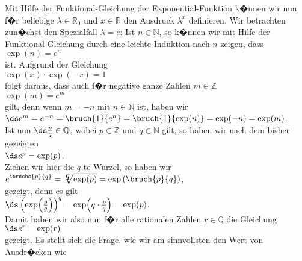 \remark
Mit Hilfe der Funktional-Gleichung der Exponential-Funktion k�nnen wir nun f�r beliebige $\lambda \in \mathbb{R}_0$
und $x \in \mathbb{R}$ den Ausdruck $\lambda^x$ definieren.  Wir betrachten zun�chst den Spezialfall
$\lambda = e$:
Ist $n \in \mathbb{N}$, so k�nnen wir mit Hilfe der Funktional-Gleichung durch eine leichte Induktion
nach $n$ zeigen, dass 
\\[0.2cm]
\hspace*{1.3cm}
$\exp(n) = e^n$
\\[0.2cm]
ist.  Aufgrund der Gleichung
\\[0.2cm]
\hspace*{1.3cm}
$\exp(x) \cdot \exp(-x) = 1$
\\[0.2cm]
folgt daraus, dass auch f�r negative ganze Zahlen $m \in \mathbb{Z}$ 
\\[0.2cm]
\hspace*{1.3cm}
$\exp(m) = e^m$
\\[0.2cm]
gilt, denn wenn $m = -n$ mit $n \in \mathbb{N}$ ist, haben wir
\\[0.2cm]
\hspace*{1.3cm}
$\ds e^m = e^{-n} = \bruch{1}{e^n} = \bruch{1}{\exp(n)} = \exp(-n) = \exp(m)$.
\\[0.2cm]
Ist nun $\ds\frac{p}{q} \in \mathbb{Q}$, wobei $p \in \mathbb{Z}$ und $q \in \mathbb{N}$ gilt, so haben wir 
nach dem bisher gezeigten
\\[0.2cm]
\hspace*{1.3cm}
$\ds e^p = \exp(p)$.
\\[0.2cm]
Ziehen wir hier die $q$-te Wurzel, so haben wir
\\[0.2cm]
\hspace*{1.3cm}
$\displaystyle e^{\bruchs{p}{q}} = \sqrt[\textstyle q]{\exp(p)} = \exp\left(\bruch{p}{q}\right)$,
\\[0.2cm]
gezeigt, denn es gilt
\\[0.2cm]
\hspace*{1.3cm}
$\ds\left(\exp\Bigl(\frac{p}{q}\Bigr)\right)^q = \exp\Bigl(q \cdot \frac{p}{q}\Bigr) = \exp(p)$.
\\[0.2cm]
Damit haben wir also nun f�r alle rationalen Zahlen $r \in \mathbb{Q}$ die Gleichung
\\[0.2cm]
\hspace*{1.3cm}
$\ds e^r = \exp(r)$
\\[0.2cm]
gezeigt.  Es stellt sich die Frage, wie wir am sinnvollsten den Wert von Ausdr�cken wie
\\[0.2cm]
\hspace*{1.3cm}
